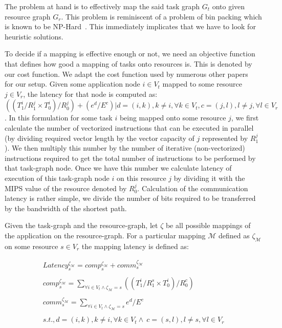 \documentclass[10pt, conference, compsocconf]{IEEEtran}
\begin{document}
The problem at hand is to effectively map the said task graph $G_t$ onto
given resource graph $G_r$. This problem is reminiscent of a problem of
bin packing which is known to be NP-Hard~\cite{vsar89}. This immediately
implicates that we have to look for heuristic solutions.

To decide if a mapping is effective enough or not, we need an objective
function that defines how good a mapping of tasks onto resources
is. This is denoted by our cost function. We adapt the cost function
used by numerous other papers~\cite{ssan05,ajai04,dajw12} for our setup.
Given some application node $i \in V_t$ mapped to some resource $j \in
V_r$, the latency for that node is computed as: $((T^i_1/R^j_1\times
T^i_0)/R^j_0) + (e^d/E^c) | d = (i,k), k \neq i, \forall k \in V_t, c =
(j,l), l \neq j, \forall l \in V_r $. In this formulation for some task
$i$ being mapped onto some resource $j$, we first calculate the number
of vectorized instructions that can be executed in parallel (by dividing
required vector length by the vector capacity of $j$ represented by
$R^j_1$). We then multiply this number by the number of iterative
(non-vectorized) instructions required to get the total number of
instructions to be performed by that task-graph node. Once we have this
number we calculate latency of execution of this task-graph node $i$ on
this resource $j$ by dividing it with the MIPS value of the resource
denoted by $R^j_0$. Calculation of the communication latency is rather
simple, we divide the number of bits required to be transferred by the
bandwidth of the shortest path.

Given the task-graph and the resource-graph, let $\zeta$ be all possible
mappings of the application on the resource-graph. For a particular
mapping $\mathcal{M}$ defined as $\zeta_\mathcal{M}$ on some resource $s
\in V_r$ the mapping latency is defined as:

\begin{equation}
  \begin{array}{c}
    Latency^{\zeta_\mathcal{M}}_s = comp^{\zeta_\mathcal{M}}_s +
comm^{\zeta_\mathcal{M}}_s\\
	\\comp^{\zeta_\mathcal{M}}_s = 
    \sum_{\forall i \in V_t \wedge
      \zeta_\mathcal{M} = s} ((T^i_1/R^s_1\times T^i_0)/R^c_0)\\
    \\comm^{\zeta_\mathcal{M}}_s =
    \sum_{\forall i \in V_t \wedge
      \zeta_\mathcal{M} = s} e^d / E^c\\ 
    \\s.t., d = (i,k), k \neq i, \forall k
    \in V_t \wedge\  c = (s,l), l \neq s, \forall l \in V_r
  \end{array}
  \label{eq:1}
\end{equation}
\end{document}
